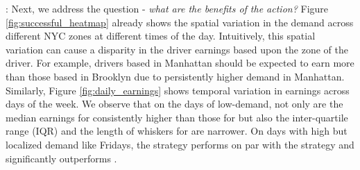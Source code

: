 : 
Next, we address the question - \textit{what are the benefits of the {\relocate} action?} Figure \ref{fig:successful_heatmap} already shows the spatial variation in the demand across different NYC zones at different times of the day.
Intuitively, this spatial variation can cause a disparity in the driver earnings based upon the zone of the driver. For example, drivers based in Manhattan should be expected 
to earn more than those based in Brooklyn due to persistently higher demand in Manhattan. Similarly, Figure \ref{fig:daily_earnings} shows temporal variation in earnings across days of the week. We observe that on the days of low-demand,
not only are the median earnings for {\relocation} consistently higher than those for {\naive} but also the inter-quartile range (IQR) and the length of whiskers for {\relocation} are narrower. On days with high but localized demand like Fridays, the {\relocation} strategy performs on par with the {\relocationflexible} strategy and significantly outperforms {\naive}.



